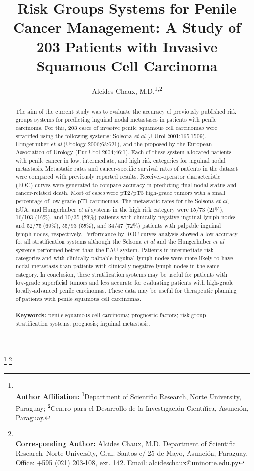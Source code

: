 \documentclass[11pt,letterpaper]{article}\usepackage[]{graphicx}\usepackage[]{color}
\title{\textbf{Risk Groups Systems for Penile Cancer Management: A Study of 203 Patients with Invasive Squamous Cell Carcinoma}}
\author{Alcides Chaux, M.D.\textsuperscript{1,2}}
\date{}
\begin{document}
\maketitle

\begin{abstract}
The aim of the current study was to evaluate the accuracy of previously published risk groups systems for predicting inguinal nodal metastases in patients with penile carcinoma. For this, 203 cases of invasive penile squamous cell carcinomas were stratified using the following systems: Solsona \emph{et al} (J Urol 2001;165:1509), Hungerhuber \emph{et al} (Urology 2006;68:621), and the proposed by the European Association of Urology (Eur Urol 2004;46:1). Each of these system allocated patients with penile cancer in low, intermediate, and high risk categories for inguinal nodal metastasis. Metastatic rates and cancer-specific survival rates of patients in the dataset were compared with previously reported results. Receiver-operator characteristic (ROC) curves were generated to compare accuracy in predicting final nodal status and cancer-related death. Most of cases were pT2/pT3 high-grade tumors with a small percentage of low grade pT1 carcinomas. The metastatic rates for the Solsona \emph{et al}, EUA, and Hungerhuber \emph{et al} systems in the high risk category were 15/73 (21\%), 16/103 (16\%), and 10/35 (29\%) patients with clinically negative inguinal lymph nodes and 52/75 (69\%), 55/93 (59\%), and 34/47 (72\%) patients with palpable inguinal lymph nodes, respectively. Performance by ROC curves analysis showed a low accuracy for all stratification systems although the Solsona \emph{et al} and the Hungerhuber \emph{et al} systems performed better than the EAU system. Patients in intermediate risk categories and with clinically palpable inguinal lymph nodes were more likely to have nodal metastasis than patients with clinically negative lymph nodes in the same category. In conclusion, these stratification systems may be useful for patients with low-grade superficial tumors and less accurate for evaluating patients with high-grade locally-advanced penile carcinomas. These data may be useful for therapeutic planning of patients with penile squamous cell carcinomas.
\\\\
\textbf{Keywords:} penile squamous cell carcinoma; prognostic factors; risk group stratification systems; prognosis; inguinal metastasis.
\end{abstract}

\let\thefootnote\relax\footnote{
\\ \textbf{Author Affiliation:} \textsuperscript{1}Department of Scientific Research, Norte University, Paraguay; \textsuperscript{2}Centro para el Desarrollo de la Investigación Científica, Asunción, Paraguay.
}
\let\thefootnote\relax\footnote{
\\ \textbf{Corresponding Author:} Alcides Chaux, M.D. Department of Scientific Research, Norte University, Gral. Santos e/ 25 de Mayo, Asunción, Paraguay. Office: +595 (021) 203-108, ext. 142. Email: \href{mailto:alcideschaux@uninorte.edu.py}{alcideschaux@uninorte.edu.py}
}
\end{document}
